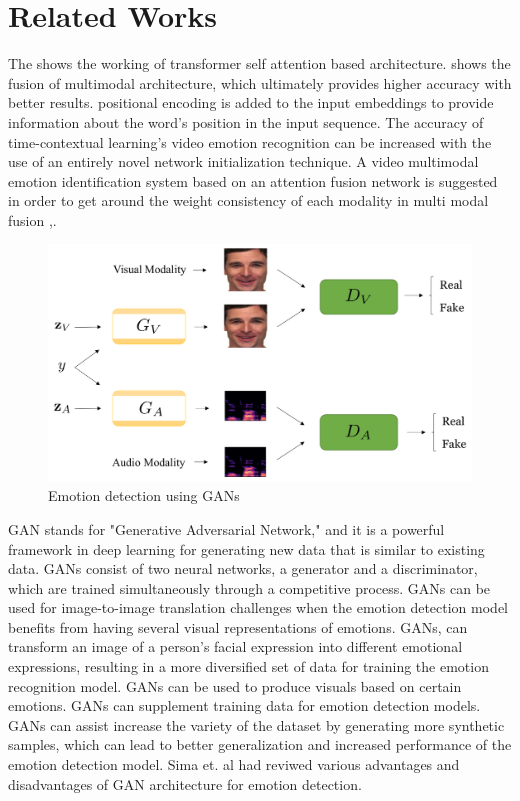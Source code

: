 \documentclass[conference]{IEEEtran}
\begin{document}
\section{Related Works}

The \cite{siriwardhana2020multimodal} shows the working of transformer self attention based architecture. \cite{makiuchi2021multimodal} shows the fusion of multimodal architecture, which ultimately provides higher accuracy with better results. \cite{ju2020transformer} positional encoding is added to the input embeddings to provide information about the word's position in the input sequence.
The accuracy of time-contextual learning's video emotion recognition can be increased with the use of an entirely novel network initialization technique.  A video multimodal emotion identification system based on an attention fusion network is suggested in order to get around the weight consistency of each modality in multi modal fusion \cite{huan2021video},\cite{abdullah2021multimodal}.

\begin{figure}[htbp]
\centerline{\includegraphics{GANs.png}}
\caption{Emotion detection using GANs \cite{KUMAR2022104483}}
\label{fig}
\end{figure}
\cite{ma2022data}

GAN stands for "Generative Adversarial Network," and it is a powerful framework in deep learning for generating new data that is similar to existing data. GANs consist of two neural networks, a generator and a discriminator, which are trained simultaneously through a competitive process. GANs can be used for image-to-image translation challenges when the emotion detection model benefits from having several visual representations of emotions. \cite{sharafi2022novel} GANs, can transform an image of a person's facial expression into different emotional expressions, resulting in a more diversified set of data for training the emotion recognition model. GANs can be used to produce visuals based on certain emotions. GANs can supplement training data for emotion detection models. GANs can assist increase the variety of the dataset by generating more synthetic samples, which can lead to better generalization and increased performance of the emotion detection model\cite{setyono2023data}. Sima et. al \cite{das2023emotion} had reviwed various advantages and disadvantages of GAN architecture for emotion detection.
\end{document}
